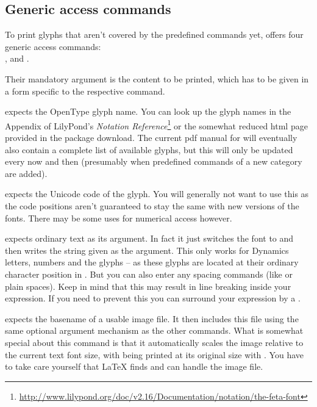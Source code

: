 \documentclass{article}
\begin{document}
\subsection{Generic access commands}
\label{subsec:generic_access_commands}
To print \emmentaler glyphs that aren't covered by the predefined commands yet, \lilyglyphs offers four generic access commands:\\
,   and . 

Their mandatory argument is the content to be printed, which has to be given in a form specific to the respective command.

\medskip
{} expects the OpenType glyph name. 
You can look up the glyph names in the Appendix of LilyPond's \emph{Notation Reference}\footnote{\url{http://www.lilypond.org/doc/v2.16/Documentation/notation/the-feta-font}} or the somewhat reduced html page provided in the package download. 
The current pdf manual for \lilyglyphs will eventually also contain a complete list of available glyphs, but this will only be updated every now and then (presumably when predefined commands of a new category are added).

\medskip
{} expects the Unicode code of the glyph. 
You will generally not want to use this as the code positions aren't guaranteed to stay the same with new versions of the fonts. 
There may be some uses for numerical access however.

\medskip
{} expects ordinary text as its argument. 
In fact it just switches the font to \emmentaler and then writes the string given as the argument. 
This only works for Dynamics letters, numbers and the glyphs  -- as these glyphs are located at their ordinary character position in \emmentaler. 
But you can also enter any spacing commands (like  or plain spaces). 
Keep in mind that this may result in line breaking inside your expression. 
If you need to prevent this you can surround your expression by a .

\medskip
{} expects the basename of a usable image file.
It then includes this file using the same optional argument mechanism as the other commands.
What is somewhat special about this command is that it automatically scales the image relative to the current text font size, with being printed at its original size with .
You have to take care yourself that \LaTeX{} finds and can handle the image file.
\end{document}
